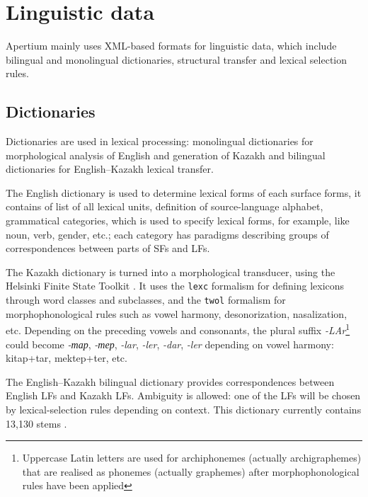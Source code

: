 \documentclass[11pt]{article}
\begin{document}
\section{Linguistic data}

Apertium mainly uses XML-based formats for linguistic data, which include bilingual and monolingual dictionaries, structural transfer and
lexical selection rules. 

\subsection{Dictionaries}

Dictionaries are used in lexical processing: monolingual dictionaries
for morphological analysis of English and generation of Kazakh and
bilingual dictionaries for English--Kazakh lexical transfer.  

The English dictionary is used to determine lexical forms of each surface
forms, it contains of list of all lexical units, definition of
source-language alphabet, grammatical categories, which is used to
specify lexical forms, for example, like noun, verb, gender, etc.;
each category has paradigms describing groups of correspondences
between parts of SFs and LFs.  

The Kazakh dictionary is turned into a
morphological transducer, using the Helsinki Finite
State Toolkit \citep{hfst/2011}. It uses the \texttt{lexc} formalism
for defining lexicons through word classes and subclasses, and the
\texttt{twol} formalism for morphophonological rules such as vowel
harmony, desonorization, nasalization, etc.  Depending on the
preceding vowels and consonants, the plural suffix \emph{-LAr}\footnote{Uppercase Latin letters are used for archiphonemes (actually archigraphemes) that are realised as phonemes (actually graphemes) after morphophonological rules have been applied} could
become \emph{-тар}, \emph{-тер}, \emph{-lar}, \emph{-ler}, \emph{-dar}, \emph{-ler} depending on vowel harmony: kitap+tar,
mektep+ter, etc. 



The English--Kazakh bilingual dictionary provides correspondences between English LFs and Kazakh LFs. Ambiguity is allowed: one of the LFs will be chosen by 
lexical-selection rules depending on context. This dictionary currently contains 13,130 stems \citep{sundetova13a}.
\end{document}
